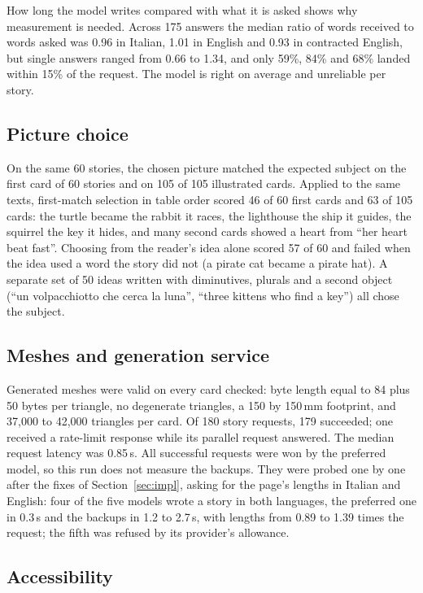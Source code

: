\documentclass[conference]{IEEEtran}
\begin{document}
How long the model writes compared with what it is asked shows why measurement is needed. Across 175 answers the median ratio of words received to words asked was 0.96 in Italian, 1.01 in English and 0.93 in contracted English, but single answers ranged from 0.66 to 1.34, and only 59\%, 84\% and 68\% landed within 15\% of the request. The model is right on average and unreliable per story.

\subsection{Picture choice}

On the same 60 stories, the chosen picture matched the expected subject on the first card of 60 stories and on 105 of 105 illustrated cards. Applied to the same texts, first-match selection in table order scored 46 of 60 first cards and 63 of 105 cards: the turtle became the rabbit it races, the lighthouse the ship it guides, the squirrel the key it hides, and many second cards showed a heart from ``her heart beat fast''. Choosing from the reader's idea alone scored 57 of 60 and failed when the idea used a word the story did not (a pirate cat became a pirate hat). A separate set of 50 ideas written with diminutives, plurals and a second object (``un volpacchiotto che cerca la luna'', ``three kittens who find a key'') all chose the subject.

\subsection{Meshes and generation service}\label{sec:evalservice}

Generated meshes were valid on every card checked: byte length equal to 84 plus 50 bytes per triangle, no degenerate triangles, a 150 by 150\,mm footprint, and 37,000 to 42,000 triangles per card. Of 180 story requests, 179 succeeded; one received a rate-limit response while its parallel request answered. The median request latency was 0.85\,s. All successful requests were won by the preferred model, so this run does not measure the backups. They were probed one by one after the fixes of Section~\ref{sec:impl}, asking for the page's lengths in Italian and English: four of the five models wrote a story in both languages, the preferred one in 0.3\,s and the backups in 1.2 to 2.7\,s, with lengths from 0.89 to 1.39 times the request; the fifth was refused by its provider's allowance.

\subsection{Accessibility}
\end{document}
